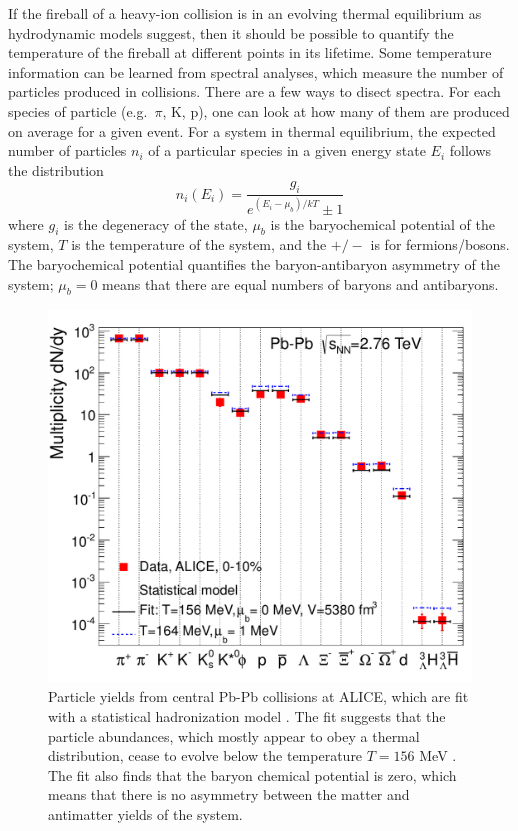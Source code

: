 If the fireball of a heavy-ion collision is in an evolving thermal equilibrium as hydrodynamic models suggest, then it should be possible to quantify the temperature of the fireball at different points in its lifetime.
Some temperature information can be learned from spectral analyses, which measure the number of particles produced in collisions.
There are a few ways to disect spectra.
For each species of particle (e.g.\ $\pi$, K, p), one can look at how many of them are produced on average for a given event.
For a system in thermal equilibrium, the expected number of particles $n_i$ of a particular species in a given energy state $E_i$ follows the distribution
\begin{equation}
\label{eq:ThermalDistribution}
n_i(E_i) = \frac{g_i}{e^{(E_i - \mu_b)/kT} \pm 1}
\end{equation}
where $g_i$ is the degeneracy of the state, $\mu_b$ is the baryochemical potential of the system,  $T$ is the temperature of the system, and the  $+/-$ is for fermions/bosons. 
The baryochemical potential quantifies the baryon-antibaryon asymmetry of the system; $\mu_b = 0$ means that there are equal numbers of baryons and antibaryons.


\begin{figure}[hbtp]
\includegraphics[width=36pc]{Figures/BorrowedFigures/ALICEYieldsThermalFit.pdf}
\caption[Thermal fit of ALICE yields]{Particle yields from central Pb-Pb collisions at ALICE, which are fit with a statistical hadronization model \cite{Stachel:2013zma}. 
The fit suggests that the particle abundances, which mostly appear to obey a thermal distribution, cease to evolve below the temperature $T = 156$ MeV .
The fit also finds that the baryon chemical potential is zero, which means that there is no asymmetry between the matter and antimatter yields of the system. 
}
\label{fig:ThermalYieldFit}
\end{figure}


